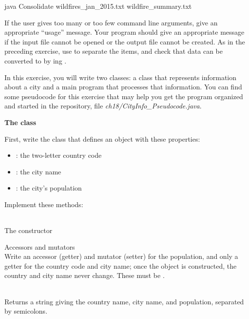 \begin{exercise}
\begin{stdout}
java Consolidate wildfires_jan_2015.txt wildfire_summary.txt
\end{stdout}

If the user gives too many or too few command line arguments, give an appropriate ``usage'' message.
Your program should give an appropriate message if the input file cannot be opened or the output file cannot be created.
As in the preceding exercise, use  to separate the items, and check that data can be converted to  by ing .
\end{exercise}

\begin{exercise}

In this exercise, you will write two classes: a class that represents information about a city and a main program that processes that information. You can find some pseudocode for this exercise that may help you get the program organized and started in the repository, file {\em ch18/CityInfo\_Pseudocode.java}.

{\large\bf{The  class}}

First, write the  class that defines an object with these properties:

\begin{itemize}
    \item {}: the two-letter country code
    \item {}: the city name
    \item {}: the city's population
\end{itemize}

Implement these methods:

\begin{description}
    \item [\texttt{public City(String country, String name, int population)}] \hfill \\ The constructor
    \item Accessors and mutators \hfill \\ Write an accessor (getter) and mutator (setter) for the population, and only a getter for the country code and city name; once the object is constructed, the country and city name never change. These must be .
    \item [\texttt{public String toString()}] \hfill \\ Returns a string giving the country name, city name, and population, separated by semicolons.
\end{description}


\end{exercise}
